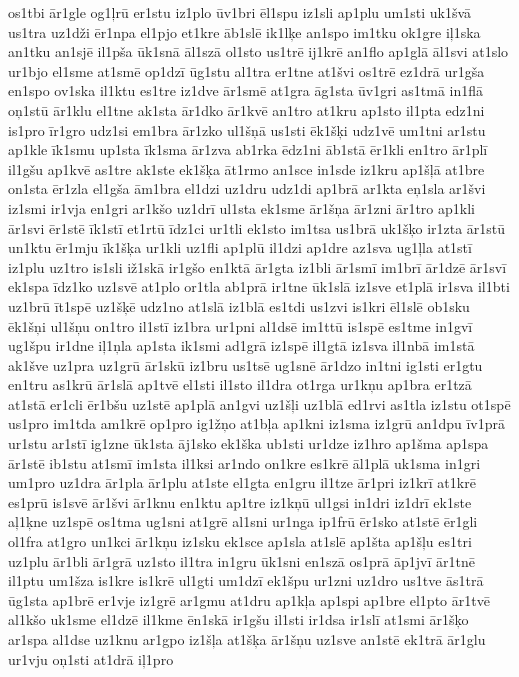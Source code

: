 {os1tbi
ār1gle
og1ļrū
er1stu
iz1plo
ūv1bri
ēl1spu
iz1sli
ap1plu
um1sti
uk1švā
us1tra
uz1dži
ēr1npa
el1pjo
et1kre
āb1slē
ik1lķe
an1spo
im1tku
ok1gre
iļ1ska
an1tku
an1sjē
il1pša
ūk1snā
āl1szā
ol1sto
us1trē
ij1krē
an1flo
ap1glā
āl1svi
at1slo
ur1bjo
el1sme
at1smē
op1dzī
ūg1stu
al1tra
er1tne
at1švi
os1trē
ez1drā
ur1gša
en1spo
ov1ska
il1ktu
es1tre
iz1dve
ār1smē
at1gra
āg1sta
ūv1gri
as1tmā
in1flā
oņ1stū
ār1klu
el1tne
ak1sta
ār1dko
ār1kvē
an1tro
at1kru
ap1sto
il1pta
edz1ni
is1pro
īr1gro
udz1si
em1bra
ār1zko
ul1šņā
us1sti
ēk1šķi
udz1vē
um1tni
ar1stu
ap1kle
īk1smu
up1sta
īk1sma
ār1zva
ab1rka
ēdz1ni
āb1stā
ēr1kli
en1tro
ār1plī
il1gšu
ap1kvē
as1tre
ak1ste
ek1šķa
āt1rmo
an1sce
in1sde
iz1kru
ap1šļā
at1bre
on1sta
ēr1zla
el1gša
ām1bra
el1dzi
uz1dru
udz1di
ap1brā
ar1kta
eņ1sla
ar1švi
iz1smi
ir1vja
en1gri
ar1kšo
uz1drī
ul1sta
ek1sme
ār1šņa
ār1zni
ār1tro
ap1kli
ār1svi
ēr1stē
īk1stī
et1rtū
īdz1ci
ur1tli
ek1sto
im1tsa
us1brā
uk1šķo
ir1zta
ār1stū
un1ktu
ēr1mju
īk1šķa
ur1kli
uz1fli
ap1plū
il1dzi
ap1dre
az1sva
ug1ļla
at1stī
iz1plu
uz1tro
is1sli
iž1skā
ir1gšo
en1ktā
ār1gta
iz1bli
ār1smī
im1brī
ār1dzē
ār1svī
ek1spa
īdz1ko
uz1svē
at1plo
or1tla
ab1prā
ir1tne
ūk1slā
iz1sve
et1plā
ir1sva
il1bti
uz1brū
īt1spē
uz1šķē
udz1no
at1slā
iz1blā
es1tdi
us1zvi
is1kri
ēl1slē
ob1sku
ēk1šņi
ul1šņu
on1tro
il1stī
iz1bra
ur1pni
al1dsē
im1ttū
is1spē
es1tme
in1gvī
ug1špu
ir1dne
iļ1ņla
ap1sta
ik1smi
ad1grā
iz1spē
il1gtā
iz1sva
il1nbā
im1stā
ak1šve
uz1pra
uz1grū
ār1skū
iz1bru
us1tsē
ug1snē
ār1dzo
in1tni
ig1sti
er1gtu
en1tru
as1krū
ār1slā
ap1tvē
el1sti
il1sto
il1dra
ot1rga
ur1kņu
ap1bra
er1tzā
at1stā
er1cli
ēr1bšu
uz1stē
ap1plā
an1gvi
uz1šļi
uz1blā
ed1rvi
as1tla
iz1stu
ot1spē
us1pro
im1tda
am1krē
op1pro
ig1žņo
at1bļa
ap1kni
iz1sma
iz1grū
an1dpu
īv1prā
ur1stu
ar1stī
ig1zne
ūk1sta
āj1sko
ek1ška
ub1sti
ur1dze
iz1hro
ap1šma
ap1spa
ār1stē
ib1stu
at1smī
im1sta
il1ksi
ar1ndo
on1kre
es1krē
āl1plā
uk1sma
in1gri
um1pro
uz1dra
ār1pla
ār1plu
at1ste
el1gta
en1gru
il1tze
ār1pri
iz1krī
at1krē
es1prū
is1svē
ār1švi
ār1knu
en1ktu
ap1tre
iz1kņū
ul1gsi
in1dri
iz1drī
ek1ste
aļ1ķne
uz1spē
os1tma
ug1sni
at1grē
al1sni
ur1nga
ip1frū
ēr1sko
at1stē
ēr1gli
ol1fra
at1gro
un1kci
ār1kņu
iz1sku
ek1sce
ap1sla
at1slē
ap1šta
ap1šļu
es1tri
uz1plu
ār1bli
ār1grā
uz1sto
il1tra
in1gru
ūk1sni
en1szā
os1prā
āp1jvī
ār1tnē
il1ptu
um1šza
is1kre
is1krē
ul1gti
um1dzī
ek1špu
ur1zni
uz1dro
us1tve
ās1trā
ūg1sta
ap1brē
er1vje
iz1grē
ar1gmu
at1dru
ap1kļa
ap1spi
ap1bre
el1pto
ār1tvē
al1kšo
uk1sme
el1dzē
il1kme
ēn1skā
ir1gšu
il1sti
ir1dsa
ir1slī
at1smi
ār1šķo
ar1spa
al1dse
uz1knu
ar1gpo
iz1šļa
at1šķa
ār1šņu
uz1sve
an1stē
ek1trā
ār1glu
ur1vju
oņ1sti
at1drā
iļ1pro
}
